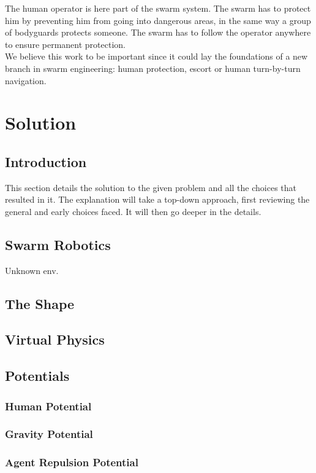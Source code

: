 \documentclass[a4paper, 12pt]{report}
\begin{document}
	The human operator is here part of the swarm system. The swarm has to protect him by preventing him from going into dangerous areas, in the same way a group of bodyguards protects someone. The swarm has to follow the operator anywhere to ensure permanent protection.\\
	
	We believe this work to be important since it could lay the foundations of a new branch in swarm engineering: human protection, escort or human turn-by-turn navigation.

\chapter{Solution}

	\section{Introduction}
	
	This section details the solution to the given problem and all the choices that resulted in it. The explanation will take a top-down approach, first reviewing the general and early choices faced. It will then go deeper in the details.
	
	\section{Swarm Robotics}
	
	Unknown env.
	\section{The Shape}
	\section{Virtual Physics}
	\section{Potentials}
		\subsection{Human Potential}
		\subsection{Gravity Potential}
		\subsection{Agent Repulsion Potential}
\end{document}

